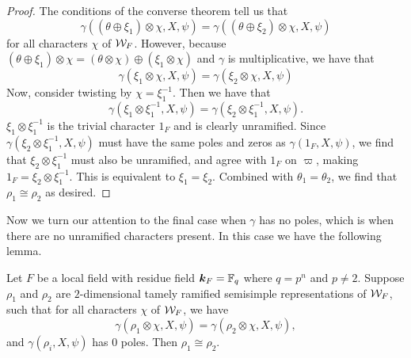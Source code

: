 \begin{proof}
  The conditions of the converse theorem tell us that
  \[ \gamma((\theta \oplus \xi_1) \otimes \chi,X,\psi) = \gamma((\theta \oplus \xi_2) \otimes \chi,X,\psi)\]
  for all characters $\chi$ of $\mathcal{W}_F$.
  However, because $(\theta \oplus \xi_1)\otimes \chi = (\theta \otimes \chi) \oplus (\xi_1 \otimes \chi)$ and $\gamma$ is multiplicative, we have that
  \[\gamma (\xi_1 \otimes \chi,X,\psi) = \gamma(\xi_2 \otimes \chi,X,\psi)\]
  Now, consider twisting by $\chi = \xi_1^{-1}$.
  Then we have that \[\gamma(\xi_1 \otimes \xi_1^{-1},X,\psi) = \gamma(\xi_2 \otimes \xi_1^{-1} , X, \psi).\]
  $\xi_1 \otimes \xi_1^{-1}$ is the trivial character $1_F$ and is clearly unramified.
  Since $\gamma(\xi_2 \otimes \xi_1^{-1}, X, \psi)$ must have the same poles and zeros as $\gamma(1_F, X, \psi)$, we find that $\xi_2 \otimes \xi_1^{-1}$ must also be unramified, and agree with $1_F$ on $\varpi$, making $1_F = \xi_2 \otimes \xi_1^{-1}$.
  This is equivalent to $\xi_1 = \xi_2$.
  Combined with $\theta_1 = \theta_2$, we find that $\rho_1 \cong \rho_2$ as desired.
\end{proof}

Now we turn our attention to the final case when $\gamma$ has no poles, which is when there are no unramified characters present.
In this case we have the following lemma.

\begin{lemma}
  \label{lem:gamma-zero-poles}
  Let $F$ be a local field with residue field $\bm{k}_F = \mathbb{F}_q$ where $q = p^n$ and $p \neq 2$.
  Suppose $\rho_1$ and $\rho_2$ are $2$-dimensional tamely ramified semisimple representations of $\mathcal{W}_F$, such that for all characters $\chi$ of $\mathcal{W}_F$, we have
  \[\gamma(\rho_1 \otimes \chi,X,\psi) = \gamma(\rho_2 \otimes \chi,X,\psi),\]
  and $\gamma(\rho_i,X,\psi)$ has $0$ poles.
  Then $\rho_1 \cong \rho_2$.
\end{lemma}

